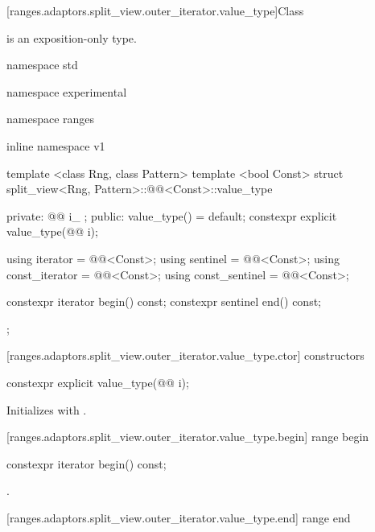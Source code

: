 [ranges.adaptors.split_view.outer_iterator.value_type]{Class }

\pnum
\enternote {} is an exposition-only type.\exitnote

\begin{codeblock}
namespace std { namespace experimental { namespace ranges { inline namespace v1 {
  template <class Rng, class Pattern>
  template <bool Const>
  struct split_view<Rng, Pattern>::@@<Const>::value_type {
  private:
    @@ i_ {};
  public:
    value_type() = default;
    constexpr explicit value_type(@@ i);

    using iterator = @@<Const>;
    using sentinel = @@<Const>;
    using const_iterator = @@<Const>;
    using const_sentinel = @@<Const>;

    constexpr iterator begin() const;
    constexpr sentinel end() const;
  };
}}}}
\end{codeblock}

[ranges.adaptors.split_view.outer_iterator.value_type.ctor]{ constructors}

%
\begin{itemdecl}
constexpr explicit value_type(@@ i);
\end{itemdecl}

\begin{itemdescr}
\pnum
\effects Initializes  with .
\end{itemdescr}

[ranges.adaptors.split_view.outer_iterator.value_type.begin]{ range begin}

%
\begin{itemdecl}
constexpr iterator begin() const;
\end{itemdecl}

\begin{itemdescr}
\pnum
\returns {}.
\end{itemdescr}

[ranges.adaptors.split_view.outer_iterator.value_type.end]{ range end}

